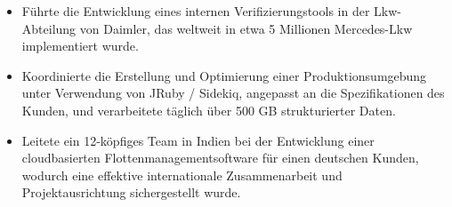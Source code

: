 \begin{itemize}
  \item Führte die Entwicklung eines internen Verifizierungstools in der Lkw-Abteilung von Daimler, das weltweit in etwa 5 Millionen Mercedes-Lkw implementiert wurde.
  \item Koordinierte die Erstellung und Optimierung einer Produktionsumgebung unter Verwendung von JRuby / Sidekiq, angepasst an die Spezifikationen des Kunden, und verarbeitete täglich über 500 GB strukturierter Daten.
  \item Leitete ein 12-köpfiges Team in Indien bei der Entwicklung einer cloudbasierten Flottenmanagementsoftware für einen deutschen Kunden, wodurch eine effektive internationale Zusammenarbeit und Projektausrichtung sichergestellt wurde.
\end{itemize}
\divider

